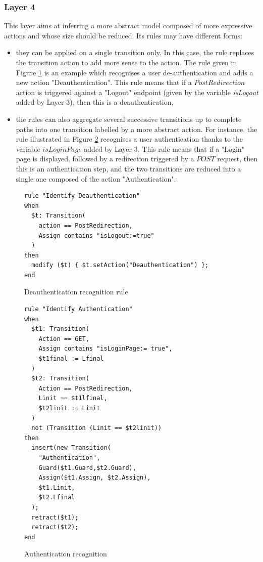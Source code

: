\subsubsection{Layer 4}

This layer aims at inferring a more abstract model composed of
more expressive actions and whose size should be reduced. Its
rules may have different forms:

\begin{itemize}
\item they can be applied on a single transition only. In this
case, the rule replaces the transition action to add more sense
to the action. The rule given in Figure \ref{fig:rule:deauth} is
an example which recognises a user de-authentication and adds a
new action "Deauthentication". This rule means that if a
$PostRedirection$ action is triggered against a "Logout" endpoint
(given by the variable \emph{isLogout} added by Layer 3), then
this is a deauthentication,

\item the rules can also aggregate several successive transitions
up to complete paths into one transition labelled by a more
abstract action. For instance, the rule illustrated in Figure
\ref{fig:rule:auth} recognises a user authentication thanks to
the variable $isLoginPage$ added by Layer 3. This rule means that
if a "Login" page is displayed, followed by a redirection
triggered by a $POST$ request, then this is an authentication
step, and the two transitions are reduced into a single one
composed of the action "Authentication".
\end{itemize}

\begin{figure}[h]
\begin{framed}
\begin{BVerbatim}
rule "Identify Deauthentication"
when
  $t: Transition(
    action == PostRedirection,
    Assign contains "isLogout:=true"
  )
then
  modify ($t) { $t.setAction("Deauthentication") };
end
\end{BVerbatim}
\end{framed}

\caption{Deauthentication recognition rule}
\label{fig:rule:deauth}
\end{figure}

\begin{figure}
\begin{framed}
\begin{BVerbatim}
rule "Identify Authentication"
when
  $t1: Transition(
    Action == GET,
    Assign contains "isLoginPage:= true",
    $t1final := Lfinal
  )
  $t2: Transition(
    Action == PostRedirection,
    Linit == $t1lfinal,
    $t2linit := Linit
  )
  not (Transition (Linit == $t2linit))
then
  insert(new Transition(
    "Authentication",
    Guard($t1.Guard,$t2.Guard),
    Assign($t1.Assign, $t2.Assign),
    $t1.Linit,
    $t2.Lfinal
  );
  retract($t1);
  retract($t2);
end
\end{BVerbatim}
\end{framed}

\caption{Authentication recognition}
\label{fig:rule:auth}
\end{figure}

